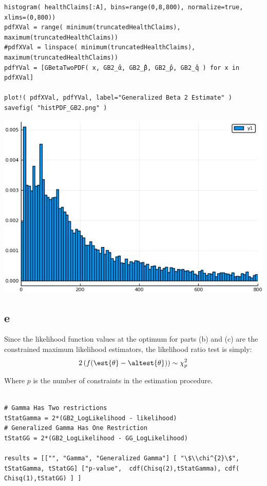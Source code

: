 \documentclass[12pt, letterpaper]{paper}
\begin{document}
\begin{verbatim}
histogram( healthClaims[:A], bins=range(0,8,800), normalize=true, xlims=(0,800))
pdfXVal = range( minimum(truncatedHealthClaims), maximum(truncatedHealthClaims))
#pdfXVal = linspace( minimum(truncatedHealthClaims), maximum(truncatedHealthClaims))
pdfYVal = [GBetaTwoPDF( x, GB2_̂α, GB2_̂β, GB2_̂p, GB2_̂q ) for x in pdfXVal]

plot!( pdfXVal, pdfYVal, label="Generalized Beta 2 Estimate" )
savefig( "histPDF_GB2.png" )
\end{verbatim}

\begin{center}
\includegraphics[width=.9\linewidth]{histPDF_GB2.png}
\end{center}

\subsection{e}
\label{sec:orgce6058a}
Since the likelihood function values at the optimum for parts (b) and
(c) are the constrained maximum likelihood estimators, the likelihood
ratio test is simply: 
\begin{equation*}
  2 \left( f( \est{\theta} - \altest{\theta}) \right) \sim \chi_{p}^{2}
\end{equation*}

Where \(p\) is the number of constraints in the estimation procedure. 
\begin{verbatim}

# Gamma Has Two restrictions
tStatGamma = 2*(GB2_LogLikelihood - likelihood)
# Generalized Gamma Has One Restriction
tStatGG = 2*(GB2_LogLikelihood - GG_LogLikelihood)

results = [["", "Gamma", "Generalized Gamma"] [ "\$\\chi^{2}\$", tStatGamma, tStatGG] ["p-value",  cdf(Chisq(2),tStatGamma), cdf( Chisq(1),tStatGG) ] ]
\end{verbatim}
\end{document}
